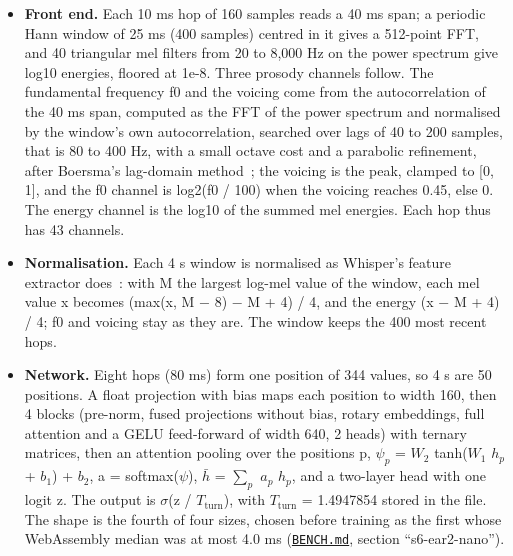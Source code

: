 \documentclass[10pt]{article}
\begin{document}
\begin{itemize}
\item \textbf{Front end.} Each 10 ms hop of 160 samples reads a 40 ms span; a periodic Hann window of 25 ms (400 samples) centred in it gives a 512-point FFT, and 40 triangular mel filters from 20 to 8,000 Hz on the power spectrum give log10 energies, floored at 1e-8. Three prosody channels follow. The fundamental frequency f0 and the voicing come from the autocorrelation of the 40 ms span, computed as the FFT of the power spectrum and normalised by the window's own autocorrelation, searched over lags of 40 to 200 samples, that is 80 to 400 Hz, with a small octave cost and a parabolic refinement, after Boersma's lag-domain method~\cite{boersma1993}; the voicing is the peak, clamped to [0, 1], and the f0 channel is log2(f0 / 100) when the voicing reaches 0.45, else 0. The energy channel is the log10 of the summed mel energies. Each hop thus has 43 channels.
\item \textbf{Normalisation.} Each 4 s window is normalised as Whisper's feature extractor does~\cite{radford2022whisper}: with M the largest log-mel value of the window, each mel value x becomes (max(x, M $-$ 8) $-$ M + 4) / 4, and the energy (x $-$ M + 4) / 4; f0 and voicing stay as they are. The window keeps the 400 most recent hops.
\item \textbf{Network.} Eight hops (80 ms) form one position of 344 values, so 4 s are 50 positions. A float projection with bias maps each position to width 160, then 4 blocks (pre-norm, fused projections without bias, rotary embeddings, full attention and a GELU feed-forward of width 640, 2 heads) with ternary matrices, then an attention pooling over the positions p, $\psi_{p}$ = $W_{2}$ tanh($W_{1}$ $h_{p}$ + $b_{1}$) + $b_{2}$, a = softmax($\psi$), $\bar h$ = $\sum_{p}$ $a_{p}$ $h_{p}$, and a two-layer head with one logit z. The output is $\sigma$(z / $T_{\mathrm{turn}}$), with $T_{\mathrm{turn}}$ = 1.4947854 stored in the file. The shape is the fourth of four sizes, chosen before training as the first whose WebAssembly median was at most 4.0 ms (\href{https://github.com/maxgfr/skycmd/blob/main/BENCH.md}{\texttt{BENCH.md}}, section ``s6-ear2-nano'').

\end{itemize}
\end{document}

